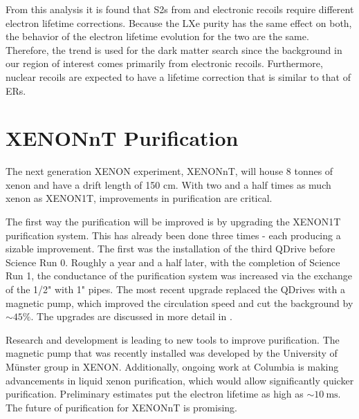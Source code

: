 From this analysis it is found that S2s from \alphadecays and electronic recoils require different electron lifetime corrections.  Because
the LXe
purity has the same effect on both, the behavior of the electron lifetime evolution for the two are the same.  Therefore, the \metakr trend
is used for the dark matter search since the background in our region of interest comes primarily from electronic
recoils.  Furthermore, nuclear recoils are expected to have a lifetime correction that is similar to that of ERs.

\section{XENONnT Purification}
\label{sec:xenonnt}
The next generation XENON experiment, XENONnT, will house 8 tonnes of xenon and have a drift length of 150 cm.  With two and a half times as
much xenon as XENON1T, improvements in purification are critical.

The first way the purification will be improved is by upgrading the XENON1T purification system.  This has already been done three
times - each producing a sizable improvement.  The first was the installation of the third QDrive before Science Run 0.  Roughly a year and
a half later, with the completion of Science Run 1, the conductance of the purification system was increased via the exchange of the 1/2"
with 1" pipes.  The most recent upgrade replaced the QDrives with a magnetic pump, which improved the circulation speed and cut the
 background by ${\sim}45\%$.  The upgrades are discussed in more detail in .

Research and development is leading to new tools to improve purification.  The magnetic pump that was recently installed was developed by the
University of M\"unster group in XENON.  Additionally, ongoing work at Columbia is making advancements in liquid xenon purification, which
would allow significantly quicker purification.  Preliminary estimates put the electron lifetime as high as ${\sim}10\ \mathrm{ms}$.  The
future of purification for XENONnT is promising.